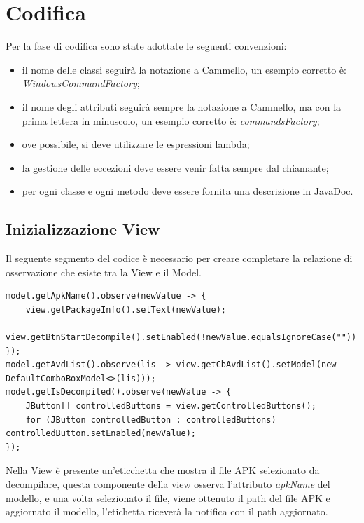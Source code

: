 \newpage
\section{Codifica}\label{sec:codifica}
Per la fase di codifica sono state adottate le seguenti convenzioni:
\begin{itemize}
    \item il nome delle classi seguirà la notazione a Cammello, un esempio corretto è: \textit{WindowsCommandFactory};
    \item il nome degli attributi seguirà sempre la notazione a Cammello, ma con la prima lettera in minuscolo, un esempio corretto è: \textit{commandsFactory};
    \item ove possibile, si deve utilizzare le espressioni lambda;
    \item la gestione delle eccezioni deve essere venir fatta sempre dal chiamante;
    \item per ogni classe e ogni metodo deve essere fornita una descrizione in JavaDoc.
\end{itemize}
\subsection{Inizializzazione View}\label{subsec:inizializzazione-view}
Il seguente segmento del codice è necessario per creare completare la relazione di osservazione che esiste tra la View e il Model.
\begin{lstlisting}[caption={Inizializzazione relazione di osservazione View e Model},label={lst:lstlisting}]
model.getApkName().observe(newValue -> {
    view.getPackageInfo().setText(newValue);
    view.getBtnStartDecompile().setEnabled(!newValue.equalsIgnoreCase(""));
});
model.getAvdList().observe(lis -> view.getCbAvdList().setModel(new DefaultComboBoxModel<>(lis)));
model.getIsDecompiled().observe(newValue -> {
    JButton[] controlledButtons = view.getControlledButtons();
    for (JButton controlledButton : controlledButtons) controlledButton.setEnabled(newValue);
});
\end{lstlisting}
Nella View è presente un'eticchetta che mostra il file APK selezionato da decompilare, questa componente della view osserva l'attributo \textit{apkName} del modello, e una volta selezionato il file, viene ottenuto il path del file APK e aggiornato il modello, l'etichetta riceverà la notifica con il path aggiornato.

